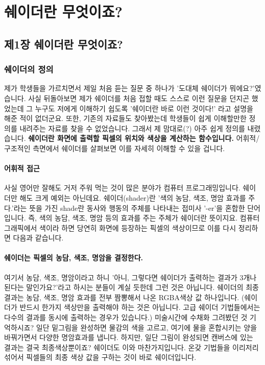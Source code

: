 \section{쉐이더란 무엇이죠?}

\subsection{제1장 쉐이더란 무엇이죠?}

\subsubsection{쉐이더의 정의}


제가 학생들을 가르치면서 제일 처음 듣는 질문 중 하나가 '도대체 쉐이더가 뭐에요?'였습니다. 사실 뒤돌아보면 제가 쉐이더를 처음 접할 때도 스스로 이런 질문을 던지곤 했었는데 그 누구도 저에게 이해하기 쉽도록 '쉐이더란 바로 이런 것이다!' 라고 설명을 해준 적이 없더군요. 또한, 기존의 자료들도 찾아봤는데 학생들이 쉽게 이해할만한 정의를 내려주는 자료를 찾을 수 없었습니다. 그래서 제 맘대로(?) 아주 쉽게 정의를 내렸습니다. \textbf{쉐이더란 화면에 출력할 픽셀의 위치와 색상을 계산하는 함수입니다.} 어휘적/구조적인 측면에서 쉐이더를 살펴보면 이를 자세히 이해할 수 있을 겁니다.

\paragraph{어휘적 접근}

사실 영어만 잘해도 거저 주워 먹는 것이 많은 분야가 컴퓨터 프로그래밍입니다. 쉐이더만 해도 크게 예외는 아닌데요. 쉐이더(shader)란 '색의 농담, 색조, 명암 효과를 주다.'라는 뜻을 가진 shade란 동사와 행동의 주체를 나타내는 접미사 '-er'을 혼합한 단어입니다. 즉, 색의 농담, 색조, 명암 등의 효과를 주는 주체가 쉐이더란 뜻이지요. 컴퓨터 그래픽에서 색이라 하면 당연히 화면에 등장하는 픽셀의 색상이므로 이를 다시 정리하면 다음과 같습니다.

\paragraph{쉐이더는 픽셀의 농담, 색조, 명암을 결정한다.}

여기서 농담, 색조, 명암이라고 하니 '아니, 그렇다면 쉐이더가 출력하는 결과가 3개나 된다는 말인가요?'라고 하시는 분들이 계실 듯한데 그런 것은 아닙니다. 쉐이더의 최종결과는 농담, 색조, 명암 효과를 전부 짬뽕해서 나온 RGBA색상 값 하나입니다. (쉐이더가 반드시 한가지 색상만을 출력해야 하는 것은 아닙니다. 고급 쉐이더 기법들에서는 다수의 결과를 동시에 출력하는 경우가 있습니다.) 미술시간에 수채화 그려봤던 것 기억하시죠? 일단 밑그림을 완성하면 물감의 색을 고르고, 여기에 물을 혼합시키는 양을 바꿔가면서 다양한 명암효과를 냅니다. 하지만, 일단 그림이 완성되면 캔버스에 있는 결과는 결국 최종색상뿐이죠? 쉐이더도 이와 마찬가지입니다. 온갖 기법들을 이리저리 섞어서 픽셀들의 최종 색상 값을 구하는 것이 바로 쉐이더입니다.

